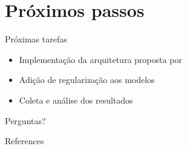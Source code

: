 \documentclass[10pt]{beamer}
\begin{document}
\section{Próximos passos}

\begin{frame}{Próximas tarefas}
    \begin{itemize}
        \item Implementação da arquitetura proposta por \cite{cambronero-deep-learning-code-search:2019}
        \item Adição de regularização aos modelos
        \item Coleta e análise dos resultados
    \end{itemize}
\end{frame}


{
\begin{frame}[standout]
  Perguntas?
\end{frame}
}

\appendix



\begin{frame}[allowframebreaks]{References}

  
  

\end{frame}
\end{document}
